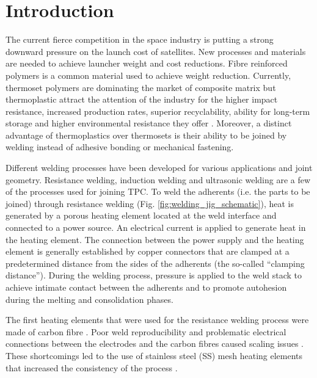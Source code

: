 \documentclass[11pt,review,times]{elsarticle}
\begin{document}
							\section{Introduction}

The current fierce competition in the space industry is putting a strong downward pressure on the launch cost of satellites. 
New processes and materials are needed to achieve launcher weight and cost reductions. 
Fibre reinforced polymers is a common material used to achieve weight reduction. 
Currently, thermoset polymers are dominating the market of composite matrix but thermoplastic attract the attention of the industry \cite{CompositeWorldSloan2018} for the higher impact resistance, increased production rates, superior recyclability, ability for long-term storage and higher environmental resistance they offer \cite{cogswell1992}. 
Moreover, a distinct advantage of thermoplastics over thermosets is their ability to be joined by welding instead of adhesive bonding or mechanical fastening. 

Different welding processes have been developed for various applications and joint geometry. 
Resistance welding, induction welding and ultrasonic welding are a few of the processes used for joining TPC. 
To weld the adherents (i.e. the parts to be joined) through resistance welding (Fig. \ref{fig:welding_jig_schematic}), heat is generated by a porous heating element located at the weld interface and connected to a power source. 
An electrical current is applied to generate heat in the heating element. 
The connection between the power supply and the heating element is generally established by copper connectors that are clamped at a predetermined distance from the sides of the adherents (the so-called “clamping distance”). 
During the welding process, pressure is applied to the weld stack to achieve intimate contact between the adherents and to promote autohesion during the melting and consolidation phases. 

The first heating elements that were used for the resistance welding process were made of carbon fibre  \cite{Ageorges2000a,houghton1984bonding,Eveno1988}.
Poor weld reproducibility and problematic electrical connections between the electrodes and the carbon fibres caused scaling issues \cite{McKnight1997}. 
These shortcomings led to the use of stainless steel (SS) mesh heating elements that increased the consistency of the process \cite{Hou1999a}.
\end{document}
